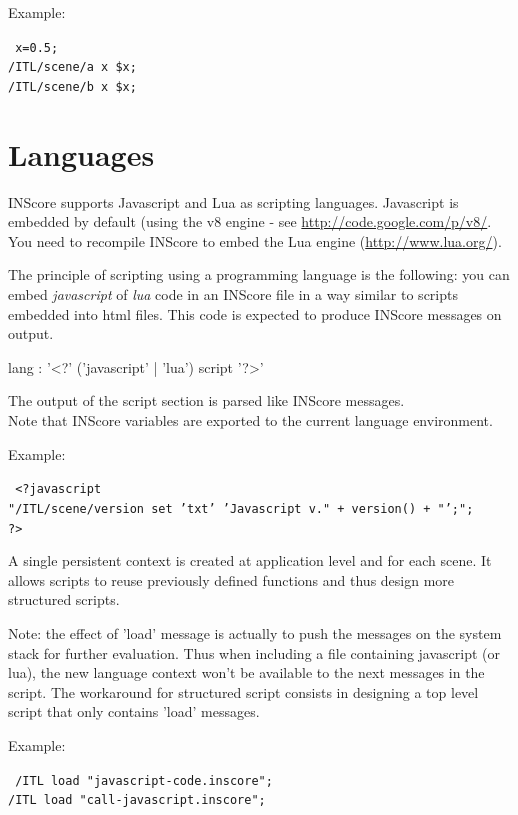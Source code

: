 \documentclass[a4paper,twoside]{report}
\newcommand{\sublevel}[1]	{\section{#1}}
\newcommand{\sample}	[1]			{\begin{center}\colorbox{mygrey}{
								\begin{minipage}[t]{0.9\columnwidth} 
								{\small \texttt{#1}}
								\end{minipage}}\end{center}}
\begin{document}
Example:
\sample{
x=0.5;\\
/ITL/scene/a x \$x;\\
/ITL/scene/b x \$x;
}

\sublevel{Languages}\label{scriptlang}


INScore supports Javascript and Lua as scripting languages. Javascript is embedded by default (using the v8 engine - see \url{http://code.google.com/p/v8/}. You need to recompile INScore to embed the Lua engine (\url{http://www.lua.org/}). 

The principle of scripting using a programming language is the following: you can embed \emph{javascript} of \emph{lua} code in an INScore file in a way similar to scripts embedded into html files. This code is expected to produce INScore messages on output.
\begin{rail} 
lang : '<?' ('javascript' | 'lua') script '?>'
\end{rail}

The output of the script section is parsed like INScore messages. \\
Note that INScore variables are exported to the current language environment.

Example:
\sample{
<?javascript \\
\hspace*{3mm} "/ITL/scene/version set 'txt' 'Javascript v."  + version() + "';"; \\
\hspace*{1mm} ?>
}


A single persistent context is created at application level and for each scene.
It allows scripts to reuse previously defined functions and thus design more structured scripts.

Note: the effect of 'load' message is actually to push the messages on the system stack for
further evaluation. Thus when including a file containing javascript (or lua), the new 
language context won't be available to the next messages in the script. The workaround 
for structured script consists in designing a top level script that only contains 'load' messages.

Example:
\sample{
\hspace*{-3mm} /ITL load "javascript-code.inscore";\\
/ITL load "call-javascript.inscore";
}
\end{document}
